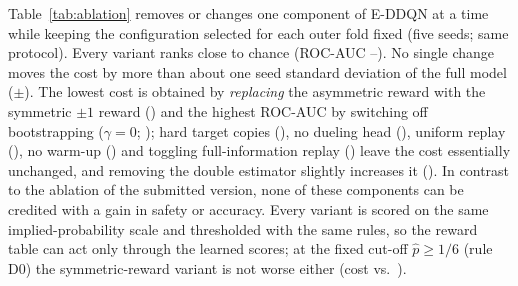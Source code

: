 Table~\ref{tab:ablation} removes or changes one component of E-DDQN at a time while keeping the configuration selected for each outer fold fixed (five seeds; same protocol). Every variant ranks close to chance (ROC-AUC \AblSoftCostRocAuc--\AblGammaZeroCostRocAuc). No single change moves the cost by more than about one seed standard deviation of the full model (\EDDQNCostCostMean$\pm$\EDDQNCostCostSD). The lowest cost is obtained by \emph{replacing} the asymmetric reward with the symmetric $\pm1$ reward (\AblAsymCostCost) and the highest ROC-AUC by switching off bootstrapping ($\gamma=0$; \AblGammaZeroCostRocAuc); hard target copies (\AblSoftCostCost), no dueling head (\AblDuelCostCost), uniform replay (\AblBalCostCost), no warm-up (\AblWarmCostCost) and toggling full-information replay (\AblFullCostCost) leave the cost essentially unchanged, and removing the double estimator slightly increases it (\AblDoubleCostCost). In contrast to the ablation of the submitted version, none of these components can be credited with a gain in safety or accuracy. Every variant is scored on the same implied-probability scale and thresholded with the same rules, so the reward table can act only through the learned scores; at the fixed cut-off $\hat p\ge1/6$ (rule D0) the symmetric-reward variant is not worse either (cost \AblAsymBayesCost{} vs.\ \EDDQNBayesCostMean).

\begin{table}[t]
\centering
\caption{Leave-one-component-out ablation of E-DDQN (selected configuration per outer fold held fixed; rule D1; mean over 5 seeds, cost $\pm$ SD).}
\label{tab:ablation}
\resizebox{\columnwidth}{!}{}
\end{table}


